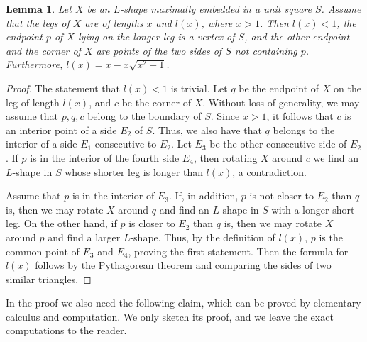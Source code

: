 \documentclass[twoside]{amsart}
\newtheorem{lemma}[theorem]{Lemma}
\begin{document}
\begin{lemma}\label{lem:mainfor3}
Let $X$ be an $L$-shape maximally embedded in a unit square $S$. Assume that the legs of $X$ are of lengths $x$ and $l(x)$, where $x > 1$. Then $l(x) < 1$, the endpoint $p$ of $X$ lying on the longer leg is a vertex of $S$, and the other endpoint and the corner of $X$ are points of the two sides of $S$ not containing $p$.
Furthermore, $l(x)=x-x\sqrt{x^2-1}$.
\end{lemma}

\begin{proof}
The statement that $l(x) < 1$ is trivial. Let $q$ be the endpoint of $X$ on the leg of length $l(x)$, and $c$ be the corner of $X$.
Without loss of generality, we may assume that $p,q,c$ belong to the boundary of $S$. Since $x > 1$, it follows that $c$ is an interior point of a side $E_2$ of $S$. Thus, we also have that $q$ belongs to the interior of a side $E_1$ consecutive to $E_2$. Let $E_3$ be the other consecutive side of $E_2$. If $p$ is in the interior of the fourth side $E_4$, then rotating $X$ around $c$ we find an $L$-shape in $S$ whose shorter leg is longer than $l(x)$, a contradiction.

Assume that $p$ is in the interior of $E_3$. If, in addition, $p$ is not closer to $E_2$ than $q$ is, then we may rotate $X$ around $q$ and find an $L$-shape in $S$ with a longer short leg. 
On the other hand, if $p$ is closer to $E_2$ than $q$ is, then we may rotate $X$ around $p$ and find a larger $L$-shape. 
Thus, by the definition of $l(x)$, $p$ is the common point of $E_3$ and $E_4$, proving the first statement. Then the formula for $l(x)$ follows by the Pythagorean theorem and comparing the sides of two similar triangles.
\end{proof}



In the proof we also need the following claim, which can be proved by elementary calculus and computation. We only sketch its proof, and we leave the exact computations to the reader.
\end{document}
